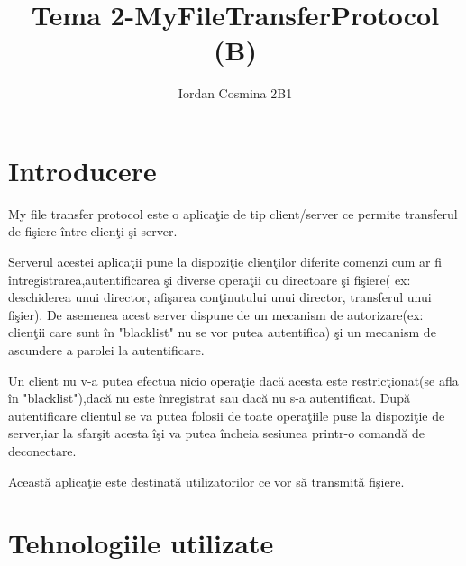 \documentclass[runningheads]{llncs}
\title{Tema 2-MyFileTransferProtocol (B)}
\author{Iordan Cosmina 2B1 }
\date{}
\institute{}
\begin{document}
\maketitle

\section{Introducere}

\par My file transfer protocol este o aplica\c{t}ie de tip client/server ce permite transferul de fi\c{s}iere \^{i}ntre clien\c{t}i \c{s}i server. 
\par Serverul acestei aplica\c{t}ii pune la dispozi\c{t}ie clien\c{t}ilor diferite comenzi cum ar fi \^{i}ntregistrarea,autentificarea \c{s}i diverse opera\c{t}ii cu directoare \c{s}i fi\c{s}iere( ex: deschiderea unui director, afi\c{s}area con\c{t}inutului unui director, transferul unui fi\c{s}ier). De asemenea acest server dispune de un mecanism de autorizare(ex: clien\c{t}ii care sunt \^{i}n "blacklist" nu se vor putea autentifica) \c{s}i un mecanism de ascundere a parolei la autentificare.
\par Un client nu v-a putea efectua nicio opera\c{t}ie dac\u{a} acesta este restric\c{t}ionat(se afla \^{i}n "blacklist"),dac\u{a} nu este \^{i}nregistrat sau dac\u{a} nu s-a autentificat. Dup\u{a} autentificare clientul se va putea folosii de toate opera\c{t}iile puse la dispozi\c{t}ie de server,iar la sfar\c{s}it acesta \^{i}\c{s}i va putea \^{i}ncheia sesiunea printr-o comand\u{a} de deconectare.
\par Aceast\u{a} aplica\c{t}ie este destinat\u{a} utilizatorilor ce vor s\u{a} transmit\u{a} fi\c{s}iere.

\section{Tehnologiile utilizate}
\end{document}

